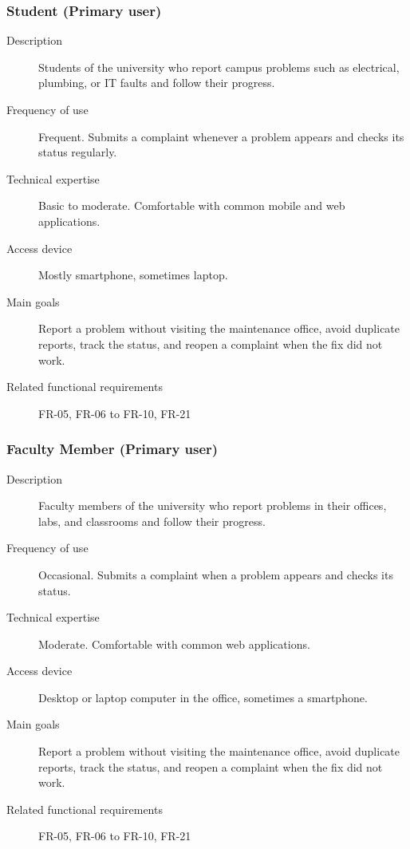 \subsubsection*{Student (Primary user)}

\begin{description}
  \item[Description] Students of the university who report campus problems such as electrical, plumbing, or IT faults and follow their progress.
  \item[Frequency of use] Frequent. Submits a complaint whenever a problem appears and checks its status regularly.
  \item[Technical expertise] Basic to moderate. Comfortable with common mobile and web applications.
  \item[Access device] Mostly smartphone, sometimes laptop.
  \item[Main goals] Report a problem without visiting the maintenance office, avoid duplicate reports, track the status, and reopen a complaint when the fix did not work.
  \item[Related functional requirements] FR-05, FR-06 to FR-10, FR-21
\end{description}

\subsubsection*{Faculty Member (Primary user)}

\begin{description}
  \item[Description] Faculty members of the university who report problems in their offices, labs, and classrooms and follow their progress.
  \item[Frequency of use] Occasional. Submits a complaint when a problem appears and checks its status.
  \item[Technical expertise] Moderate. Comfortable with common web applications.
  \item[Access device] Desktop or laptop computer in the office, sometimes a smartphone.
  \item[Main goals] Report a problem without visiting the maintenance office, avoid duplicate reports, track the status, and reopen a complaint when the fix did not work.
  \item[Related functional requirements] FR-05, FR-06 to FR-10, FR-21
\end{description}

